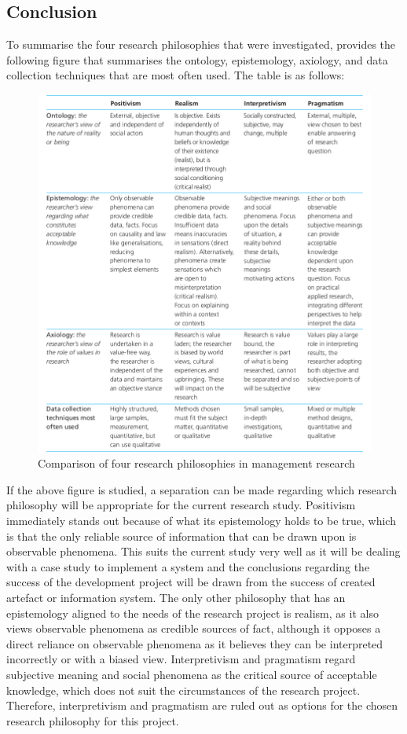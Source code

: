\subsection{Conclusion}
\par{To summarise the four research philosophies that were investigated, \cite{saunders2003research} provides the following figure that summarises the ontology, epistemology, axiology, and data collection techniques that are most often used. The table is as follows:
\clearpage
}
\begin{figure}[h!]
    \centering
    \includegraphics[width=1\linewidth]{img/comparison of research philosophies.png}
    \caption{Comparison of four research philosophies in management research}
    \label{fig:enter-label}
\end{figure}
\par{If the above figure is studied, a separation can be made regarding which research philosophy will be appropriate for the current research study. Positivism immediately stands out because of what its epistemology holds to be true, which is that the only reliable source of information that can be drawn upon is observable phenomena. This suits the current study very well as it will be dealing with a case study to implement a system and the conclusions regarding the success of the development project will be drawn from the success of created artefact or information system. The only other philosophy that has an epistemology aligned to the needs of the research project is realism, as it also views observable phenomena as credible sources of fact, although it opposes a direct reliance on observable phenomena as it believes they can be interpreted incorrectly or with a biased view. Interpretivism and pragmatism regard subjective meaning and social phenomena as the critical source of acceptable knowledge, which does not suit the circumstances of the research project. Therefore, interpretivism and pragmatism are ruled out as options for the chosen research philosophy for this project. }
